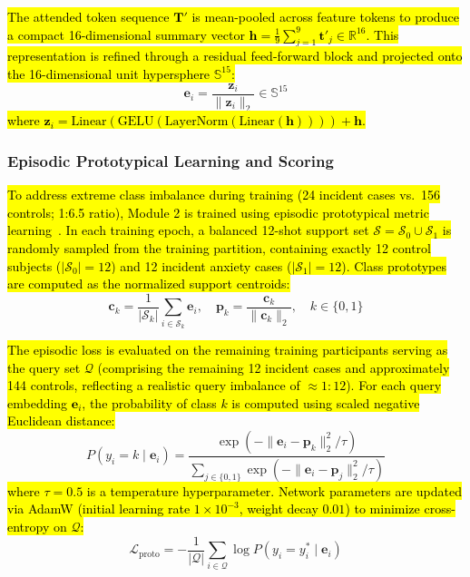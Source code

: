 \documentclass[10pt,letterpaper]{article}
\begin{document}
        \hl{The attended token sequence $\mathbf{T}'$ is mean-pooled across feature tokens to produce a compact 16-dimensional summary vector $\mathbf{h} = \frac{1}{9}\sum_{j=1}^9 \mathbf{t}'_j \in \mathbb{R}^{16}$. This representation is refined through a residual feed-forward block and projected onto the 16-dimensional unit hypersphere $\mathbb{S}^{15}$:}
        \begin{equation} \label{eq:l2_norm_m2}
        \mathbf{e}_i = \frac{\mathbf{z}_i}{\|\mathbf{z}_i\|_2} \in \mathbb{S}^{15}
        \end{equation}
        \hl{where $\mathbf{z}_i = \text{Linear}(\text{GELU}(\text{LayerNorm}(\text{Linear}(\mathbf{h})))) + \mathbf{h}$.}

        \subsubsection*{\textbf{Episodic Prototypical Learning and Scoring}}
        \hl{To address extreme class imbalance during training (24 incident cases vs.\ 156 controls; 1:6.5 ratio), Module 2 is trained using episodic prototypical metric learning~\cite{ref_snell}. In each training epoch, a balanced 12-shot support set $\mathcal{S} = \mathcal{S}_0 \cup \mathcal{S}_1$ is randomly sampled from the training partition, containing exactly 12 control subjects ($|\mathcal{S}_0| = 12$) and 12 incident anxiety cases ($|\mathcal{S}_1| = 12$). Class prototypes are computed as the normalized support centroids:}
        \begin{equation} \label{eq:proto_calc}
        \mathbf{c}_k = \frac{1}{|\mathcal{S}_k|}\sum_{i \in \mathcal{S}_k} \mathbf{e}_i,\quad \mathbf{p}_k = \frac{\mathbf{c}_k}{\|\mathbf{c}_k\|_2},\quad k \in \{0, 1\}
        \end{equation}

        \hl{The episodic loss is evaluated on the remaining training participants serving as the query set $\mathcal{Q}$ (comprising the remaining 12 incident cases and approximately 144 controls, reflecting a realistic query imbalance of $\approx 1:12$). For each query embedding $\mathbf{e}_i$, the probability of class $k$ is computed using scaled negative Euclidean distance:}
        \begin{equation} \label{eq:proto_query_prob}
        P(y_i = k \mid \mathbf{e}_i) = \frac{\exp(-\|\mathbf{e}_i - \mathbf{p}_k\|_2^2 / \tau)}{\sum_{j \in \{0, 1\}} \exp(-\|\mathbf{e}_i - \mathbf{p}_j\|_2^2 / \tau)}
        \end{equation}
        \hl{where $\tau = 0.5$ is a temperature hyperparameter. Network parameters are updated via AdamW (initial learning rate $1 \times 10^{-3}$, weight decay $0.01$) to minimize cross-entropy on $\mathcal{Q}$:}
        \begin{equation} \label{eq:proto_loss}
        \mathcal{L}_{\text{proto}} = -\frac{1}{|\mathcal{Q}|} \sum_{i \in \mathcal{Q}} \log P(y_i = y_i^* \mid \mathbf{e}_i)
        \end{equation}
\end{document}
